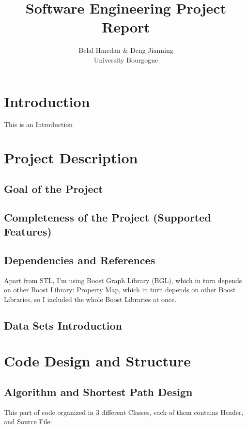 \documentclass[a4paper,english]{book}
\title{\textbf{Software Engineering Project Report}}
\begin{document}
\author{Belal Hmedan \& Deng Jianning\\University Bourgogne}
\maketitle
\let\cleardoublepage\clearpage
\tableofcontents
\chapter*{Introduction}
 
This is an Introduction
\chapter{Project Description}
\section{Goal of the Project}
\section{Completeness of the Project (Supported Features)}
\section{Dependencies and References}
Apart from STL, I’m using Boost Graph Library (BGL), which in turn depends on other Boost Library: Property Map, which in turn depends on other Boost Libraries, so I included the whole Boost Libraries at once.
\section{Data Sets Introduction}
\chapter{Code Design and Structure}
\section{Algorithm and Shortest Path Design}
This part of code organized in 3 different Classes, each of them contains Header, and Source File:
\end{document}
